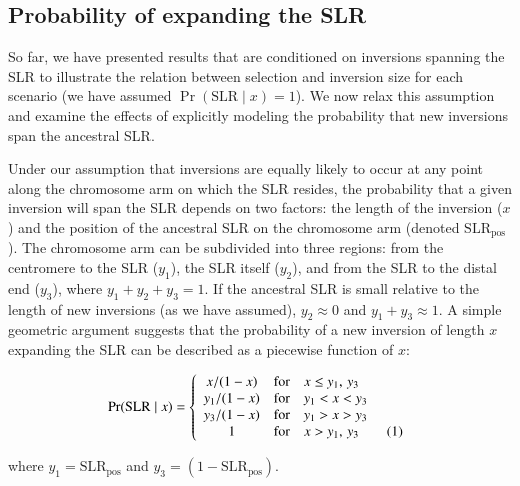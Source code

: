 \documentclass{article}[12pt]
\newcommand\numberthis{\addtocounter{equation}{1}\tag{\theequation}}
\begin{document}
\subsection*{Probability of expanding the SLR}\label{sec:ProbExpSLR}

So far, we have presented results that are conditioned on inversions spanning the SLR to illustrate the relation between selection and inversion size for each scenario (we have assumed $\Pr(\text{SLR} \mid x) = 1$). %
We now relax this assumption and examine the effects of explicitly modeling the probability that new inversions span the ancestral SLR.

Under our assumption that inversions are equally likely to occur at any point along the chromosome arm on which the SLR resides, the probability that a given inversion will span the SLR depends on two factors: the length of the inversion ($x$) and the position of the ancestral SLR on the chromosome arm (denoted $\text{SLR}_{\text{pos}}$). The chromosome arm can be subdivided into three regions: from the centromere to the SLR ($y_1$), the SLR itself ($y_2$), and from the SLR to the distal end ($y_3$), where $y_1 + y_2 + y_3 = 1$. If the ancestral SLR is small relative to the length of new inversions (as we have assumed), $y_2 \approx 0$ and $y_1 + y_3 \approx 1$. A simple geometric argument suggests that the probability of a new inversion of length $x$ expanding the SLR can be described as a piecewise function of $x$:
\begin{linenomath*}
\begin{equation}\label{eq:PrSpanSLR}
	\Pr(\text{SLR} \mid x) = \left\{ 
		\begin{array}{ccl} 
			x  /(1 - x) & \mbox{for} & x \leq y_1,\,y_3 \\
			y_1/(1 - x) & \mbox{for} & y_1 < x < y_3 \\ 
			y_3/(1 - x) & \mbox{for} & y_1 > x > y_3 \\ 
			1 & \mbox{for} & x > y_1,\,y_3 \numberthis			
		\end{array}\right.
\end{equation}
\end{linenomath*}

\noindent where $y_1 = \text{SLR}_{\text{pos}}$ and $y_3 = (1 - \text{SLR}_{\text{pos}})$. 
\end{document}

